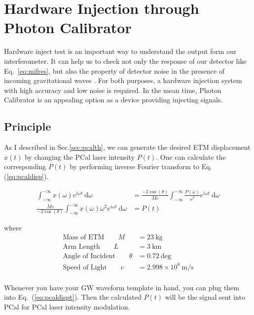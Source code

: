 
\chapter{Hardware Injection through Photon Calibrator}

Hardware inject test is an important way to understand the output form our interferometer. It can help us to check not only the response of our detector like Eq.~\ref{eq:mifres}, but also the property of detector noise in the presence of incoming gravitational waves \cite{ligo:inj}. For both purposes, a hardware injection system with high accuracy and low noise is required. In the mean time, Photon Calibrator is an appealing option as a device providing injecting signals. 

\section{Principle}
 As I described in Sec.\ref{sec:pcalth}, we can generate the desired ETM displacement $x(t)$ by changing the PCal laser intensity $P(t)$. One can calculate the corresponding $P(t)$ by performing inverse Fourier transform to Eq.(\ref{eq:pcaldisp}).
 
\begin{align}
    \int_{-\infty}^{-\infty} x(\omega) e^{i \omega t} ~\mathrm{d} \omega &= 
     \frac{-2   \cos(\theta)}{Mc} 
     \int_{-\infty}^{-\infty}\frac{P(\omega)}{\omega^2} e^{i \omega t} ~\mathrm{d} \omega \\
\label{eq:pcaldispt}
    \frac{Mc}{-2 \cos(\theta)} \int_{-\infty}^{-\infty}
     x(\omega) \omega^2 e^{i \omega t} ~\mathrm{d} \omega 
&= P(t) 
\end{align}

where
\begin{align*}
   \text{Mass of ETM} \qquad  M &= 23 ~\mathrm{kg} \\
   \text{Arm Length} \qquad   L &= 3 ~\mathrm{km}  \\
   \text{Angle of Incident} \qquad   \theta &= 0.72 ~\mathrm{deg}  \\
   \text{Speed of Light} \qquad   c &= 2.998\times10^8 ~\mathrm{m/s} \\
\end{align*}

Whenever you have your GW waveform template in hand, you can plug them into Eq.~(\ref{eq:pcaldispt}). Then the calculated $P(t)$ will be the signal sent into PCal for PCal laser intensity modulation.

